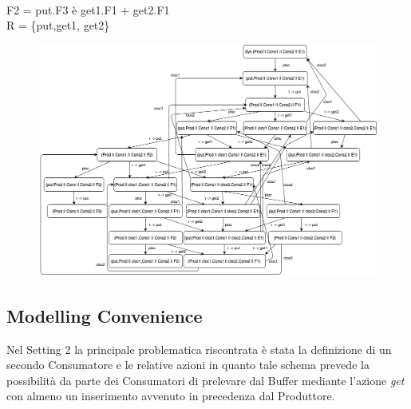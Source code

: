 \documentclass{article}
\begin{document}
\\F2 = put.F3 è get1.F1 + get2.F1
\\R = \{put,get1, get2\}
\begin{figure}[h] 
\centering
\includegraphics[scale=0.45]{DGSet2.png}
\end{figure}
\subsection{Modelling Convenience}
Nel Setting 2 la principale problematica riscontrata è stata la definizione di un secondo Consumatore e le relative azioni in quanto tale schema prevede la possibilità da parte dei Consumatori di prelevare dal Buffer mediante l'azione \textit{get} con almeno un inserimento avvenuto in precedenza dal Produttore.
\clearpage
\end{document}
